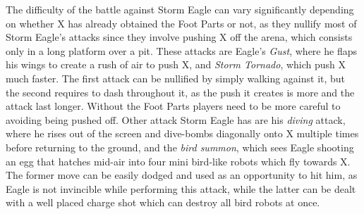 The difficulty of the battle against Storm Eagle can vary significantly depending on whether X has already obtained the Foot Parts or not, as they nullify most of Storm Eagle's attacks since they involve pushing X off the arena, which consists only in a long platform over a pit. These attacks are Eagle's \emph{Gust}, where he flaps his wings to create a rush of air to push X, and \emph{Storm Tornado}, which push X much faster. The first attack can be nullified by simply walking against it, but the second requires to dash throughout it, as the push it creates is more and the attack last longer.  Without the Foot Parts players need to be more careful to avoiding being pushed off. Other attack Storm Eagle has are his \emph{diving} attack, where he rises out of the screen and dive-bombs diagonally onto X multiple times before returning to the ground, and the \emph{bird summon}, which sees Eagle shooting an egg that hatches mid-air into four mini bird-like robots which fly towards X. The former move can be easily dodged and used as an opportunity to hit him, as Eagle is not invincible while performing this attack, while the latter can be dealt with a well placed charge shot which can destroy all bird robots at once.

